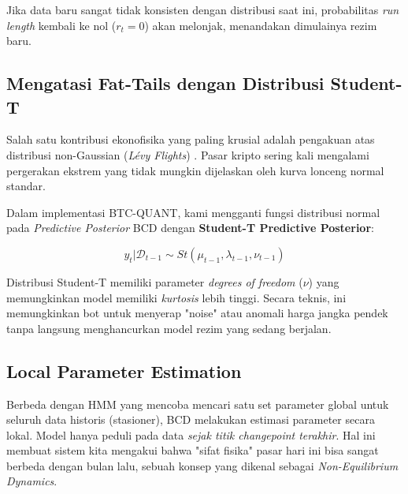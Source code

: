 Jika data baru sangat tidak konsisten dengan distribusi saat ini, probabilitas \textit{run length} kembali ke nol ($r_t = 0$) akan melonjak, menandakan dimulainya rezim baru.

\subsection{Mengatasi Fat-Tails dengan Distribusi Student-T}
Salah satu kontribusi ekonofisika yang paling krusial adalah pengakuan atas distribusi non-Gaussian (\textit{Lévy Flights}) \cite{mandelbrot2010misbehavior}. Pasar kripto sering kali mengalami pergerakan ekstrem yang tidak mungkin dijelaskan oleh kurva lonceng normal standar.

Dalam implementasi BTC-QUANT, kami mengganti fungsi distribusi normal pada \textit{Predictive Posterior} BCD dengan \textbf{Student-T Predictive Posterior}:

\begin{equation}
    y_t | \mathcal{D}_{t-1} \sim St(\mu_{t-1}, \lambda_{t-1}, \nu_{t-1})
\end{equation}

Distribusi Student-T memiliki parameter \textit{degrees of freedom} ($\nu$) yang memungkinkan model memiliki \textit{kurtosis} lebih tinggi. Secara teknis, ini memungkinkan bot untuk menyerap "noise" atau anomali harga jangka pendek tanpa langsung menghancurkan model rezim yang sedang berjalan.

\subsection{Local Parameter Estimation}
Berbeda dengan HMM yang mencoba mencari satu set parameter global untuk seluruh data historis (stasioner), BCD melakukan estimasi parameter secara lokal. Model hanya peduli pada data \textit{sejak titik changepoint terakhir}. Hal ini membuat sistem kita mengakui bahwa "sifat fisika" pasar hari ini bisa sangat berbeda dengan bulan lalu, sebuah konsep yang dikenal sebagai \textit{Non-Equilibrium Dynamics}.

